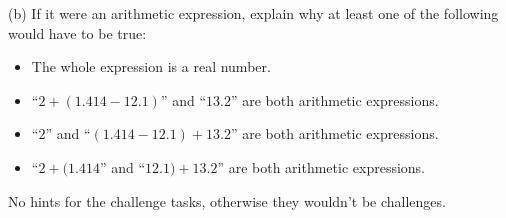 \documentclass[a4paper,12pt]{article}
\begin{document}
\begin{enumerate}
(b) If it were an arithmetic expression, explain why at least one of the
following would have to be true:
\begin{itemize}
\item The whole expression is a real number.
\item ``$2+(1.414-12.1)$'' and ``$13.2$'' are both arithmetic expressions.
\item ``$2$'' and ``$(1.414-12.1)+13.2$'' are both arithmetic expressions.
\item ``$2+(1.414$'' and ``$12.1)+13.2$'' are both arithmetic expressions.
\end{itemize}
\end{enumerate}

No hints for the challenge tasks, otherwise they wouldn't be challenges.
\end{document}

